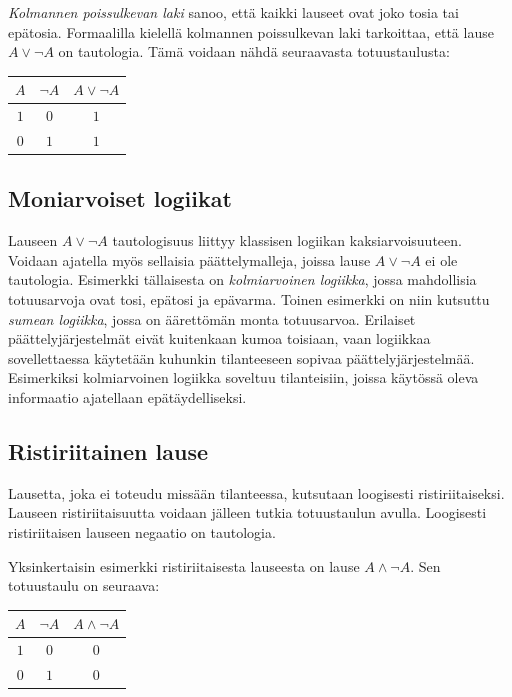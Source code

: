 {\em Kolmannen poissulkevan laki} sanoo, että kaikki lauseet ovat joko tosia tai epätosia. Formaalilla kielellä kolmannen poissulkevan laki tarkoittaa, että lause $A \lor \lnot A$ on tautologia. Tämä voidaan nähdä seuraavasta totuustaulusta:

\bigskip

\begin{center}
\begin{tabular}{|c|c|c|}\hline
$A$ & $\lnot A$ & $A \lor  \lnot A$ \\ \hline
$1$ & $0$ & $1$\\
$0$ & $1$ & $1$\\ \hline
\end{tabular}
\end{center}

\bigskip


\subsection*{Moniarvoiset logiikat}%
Lauseen $A \lor \lnot A$ tautologisuus liittyy klassisen logiikan kaksiarvoisuuteen. Voidaan ajatella myös sellaisia päättelymalleja, joissa lause $A \lor \lnot A$ ei ole tautologia. Esimerkki tällaisesta on {\em kolmiarvoinen logiikka}, jossa mahdollisia totuusarvoja ovat tosi, epätosi ja epävarma.  Toinen esimerkki on niin kutsuttu {\em sumean logiikka}, jossa on äärettömän monta totuusarvoa. Erilaiset päättelyjärjestelmät eivät kuitenkaan kumoa toisiaan, vaan logiikkaa sovellettaessa käytetään kuhunkin tilanteeseen sopivaa päättelyjärjestelmää. Esimerkiksi kolmiarvoinen logiikka soveltuu tilanteisiin, joissa käytössä oleva informaatio ajatellaan epätäydelliseksi.


\subsection*{Ristiriitainen lause}
Lausetta, joka ei toteudu missään tilanteessa, kutsutaan loogisesti ristiriitaiseksi. Lauseen ristiriitaisuutta voidaan jälleen tutkia totuustaulun avulla. Loogisesti ristiriitaisen lauseen negaatio on tautologia. 

Yksinkertaisin esimerkki ristiriitaisesta lauseesta on lause $A\land \lnot A$. Sen totuustaulu on seuraava:

\bigskip

\begin{center}
\begin{tabular}{|c|c|c|}\hline
$A$ & $\lnot A$ & $A \land  \lnot A$ \\ \hline
$1$ & $0$ & $0$\\
$0$ & $1$ & $0$\\ \hline
\end{tabular}
\end{center}

